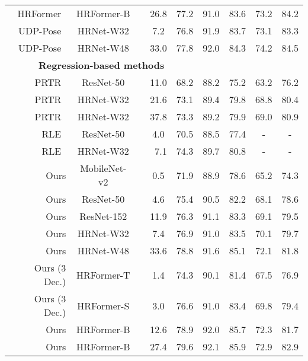 \documentclass[runningheads]{llncs}
\begin{document}
\begin{table}[!t]
{\begin{tabular}{r |c|c|c|c|c|c|c|c}
        HRFormer~\cite{yuan2021hrformer}       & HRFormer-B       &  &  26.8        & 77.2 & 91.0 & 83.6 & 73.2 & 84.2 \\
        UDP-Pose~\cite{huang2020devil}           & HRNet-W32       &  &  7.2        & 76.8 & 91.9 & 83.7 & 73.1 & 83.3 \\
        UDP-Pose~\cite{huang2020devil}           & HRNet-W48       &  &  33.0        & 77.8 & 92.0 & 84.3 & 74.2 & 84.5 \\
        \hline
        \multicolumn{5}{c}{\textbf{Regression-based methods}} \\
	    \hline
PRTR~\cite{li2021PRTR}                      & ResNet-50  &  & 11.0     & 68.2 & 88.2 & 75.2 & 63.2 & 76.2 \\
	    PRTR~\cite{li2021PRTR}                      & HRNet-W32  &  & 21.6     & 73.1 & 89.4 & 79.8 & 68.8 & 80.4 \\
        PRTR~\cite{li2021PRTR}                      & HRNet-W32  &  & 37.8     & 73.3 & 89.2 & 79.9 & 69.0 & 80.9 \\
		RLE~\cite{li2021human}                      & ResNet-50         &  & 4.0      & 70.5 & 88.5 & 77.4 & -    &  -   \\
		RLE~\cite{li2021human}                      & HRNet-W32 &  & ~7.1 & 74.3 & 89.7& 80.8 & -   & - \\
		Ours                                        & MobileNet-v2         &  &  0.5   & 71.9 & 88.9 & 78.6 & 65.2 & 74.3 \\
Ours                                          & ResNet-50         &  &  4.6     & 75.4 & 90.5 & 82.2 & 68.1 & 78.6 \\ Ours                                          & ResNet-152      &  &  11.9    & 76.3 & 91.1 & 83.3 & 69.1 & 79.5 \\ Ours                                        & HRNet-W32         &  &   7.4   & 76.9 & 91.0 & 83.5 & 70.1 & 79.7 \\ Ours                                        & HRNet-W48         &  &   33.6   & 78.8 & 91.6 & 85.1 & 72.1 & 81.8 \\ Ours (3 Dec.)                               & HRFormer-T         &  &  1.4    & 74.3 & 90.1 & 81.4 & 67.5 & 76.9 \\ Ours (3 Dec.)                               & HRFormer-S         &  &  3.0     & 76.6 & 91.0 & 83.4 & 69.8 & 79.4 \\ Ours                                        & HRFormer-B         &  & 12.6     & 78.9 & 92.0 & 85.7 & 72.3 & 81.7 \\ Ours                                        & HRFormer-B         &  & 27.4     & 79.6 & 92.1 & 85.9 & 72.9 & 82.9 \\ \hline
	\end{tabular}}
\label{tab:comparisons_with_sota_on_val}
\end{table}
\end{document}
